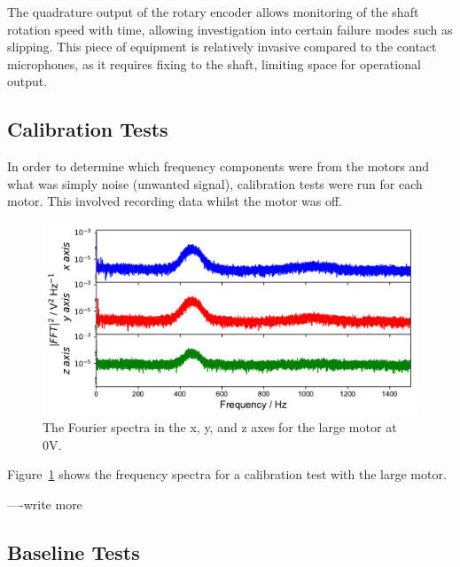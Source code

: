 The quadrature output of the rotary encoder allows monitoring of the shaft rotation speed with time, allowing investigation into certain failure modes such as slipping. This piece of equipment is relatively invasive compared to the contact microphones, as it requires fixing to the shaft, limiting space for operational output. 


\subsection{Calibration Tests}

In order to determine which frequency components were from the motors and what was simply noise (unwanted signal), calibration tests were run for each motor. This involved recording data whilst the motor was off. 

\begin{figure}[t]
    \includegraphics[width=1.0\textwidth]{fig/freq_large_0V.pdf}
    \caption[Calibration Frequency 1]{The Fourier spectra in the x, y, and z axes for the large motor at 0V.}
    \label{fig:freq_large0V}
\end{figure}

Figure~\ref{fig:freq_large0V} shows the frequency spectra for a calibration test with the large motor. 

----write more

\subsection{Baseline Tests}

